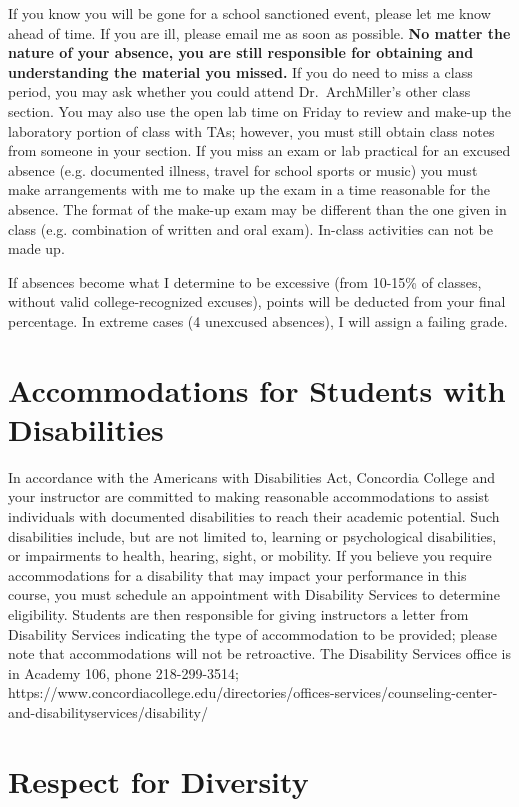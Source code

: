 \documentclass{tufte-handout}
\begin{document}
\begin{fullwidth}
If you know you will be gone for a school sanctioned event, please let me know ahead of time. If you are ill, please email me as soon as possible. \textbf{No matter the nature of your absence, you are still responsible for obtaining and understanding the material you missed.} If you do need to miss a class period, you may ask whether you could attend Dr.\ ArchMiller's other class section. You may also use the open lab time on Friday to review and make-up the laboratory portion of class with TAs; however, you must still obtain class notes from someone in your section.  If you miss an exam or lab practical for an excused absence (e.g. documented illness, travel for school sports or music) you must make arrangements with me to make up the exam in a time reasonable for the absence. The format of the make-up exam may be different than the one given in class (e.g. combination of written and oral exam). In-class activities can not be made up.

If absences become what I determine to be excessive (from 10-15\% of classes, without valid college-recognized excuses), points will be deducted from your final percentage. In extreme cases (4 unexcused absences), I will assign a failing grade. 

\section{Accommodations for Students with Disabilities}

In accordance with the Americans with Disabilities Act, Concordia College and your instructor are committed to making reasonable accommodations to assist individuals with documented disabilities to reach their academic potential. Such disabilities include, but are not limited to, learning or psychological disabilities, or impairments to health, hearing, sight, or mobility. If you believe you require accommodations for a disability that may impact your performance in this course, you must schedule an appointment with Disability Services to determine eligibility. Students are then responsible for giving instructors a letter from Disability Services indicating the type of accommodation to be provided; please note that accommodations will not be retroactive. The Disability Services office is in Academy 106, phone 218-299-3514; https://www.concordiacollege.edu/directories/offices-services/counseling-center-and-disabilityservices/disability/ 

\section{Respect for Diversity}


\end{fullwidth}
\end{document}
